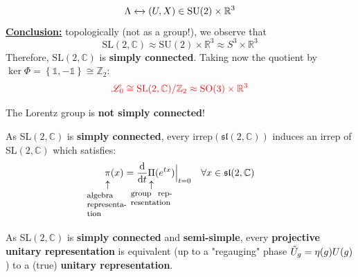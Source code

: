 \documentclass[../main.tex]{subfiles}
\begin{document}
\[
\Lambda\xleftrightarrow[]{}(U,X)\in\text{SU}(2)\times\mathbb{R}^3
\]
\underline{\textbf{Conclusion:}} topologically (not as a group!), we observe that 
\[
\textrm{SL}(2,\mathbb{C})\approx\textrm{SU}(2)\times\mathbb{R}^3\approx S^3\times\mathbb{R}^3
\]
Therefore, $\textrm{SL}(2,\mathbb{C})$ is \textbf{simply connected}. Taking now the quotient by $\ker\Phi=\left\{\mathbb{1},-\mathbb{1}\right\}\cong\mathbb{Z}_2$:
\[
{\color{red}\mathcal{L}_0\cong\text{SL}(2,\mathbb{C})/\mathbb{Z}_2\approx\text{SO}(3)\times\mathbb{R}^3}
\]
\begin{corollary}
The Lorentz group is \textbf{not simply connected}!
\end{corollary}
\begin{corollary}
As SL$(2,\mathbb{C})$ is \textbf{simply connected}, every irrep$(\mathfrak{sl}(2,\mathbb{C}))$ induces an irrep of SL$(2,\mathbb{C})$ which satisfies:
\[
\underset{\mathclap{\tikz \node {$\uparrow$} node [below=1ex] {\footnotesize \parbox{1.5cm}{algebra representation}};}}\pi(x)=\dv{t}\underset{\mathclap{\tikz \node {$\uparrow$} node [below=1ex] {\footnotesize \parbox{1.5cm}{group representation}};}}\Pi(e^{tx})\Bigr|_{\substack{t=0}} \quad \forall x\in\mathfrak{sl}(2,\mathbb{C})
\]
\end{corollary}
\begin{corollary}
As SL$(2,\mathbb{C})$ is \textbf{simply connected} and \textbf{semi-simple}, every \textbf{projective unitary representation} is equivalent (up to a "regauging" phase $\Tilde{U}_g=\eta(g)U(g)$) to a (true) \textbf{unitary representation}.
\end{corollary}
\end{document}
